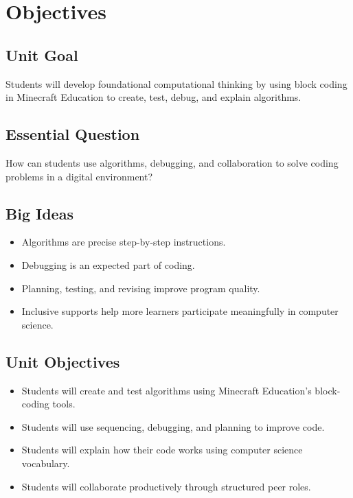 \documentclass[12pt]{article}
\begin{document}
\newpage
\section{Objectives}

\subsection{Unit Goal}

Students will develop foundational computational thinking by using block coding in Minecraft Education to create, test, debug, and explain algorithms.

\subsection{Essential Question}

How can students use algorithms, debugging, and collaboration to solve coding problems in a digital environment?

\subsection{Big Ideas}

\begin{itemize}
\item Algorithms are precise step-by-step instructions.
\item Debugging is an expected part of coding.
\item Planning, testing, and revising improve program quality.
\item Inclusive supports help more learners participate meaningfully in computer science.
\end{itemize}

\subsection{Unit Objectives}

\begin{itemize}
\item Students will create and test algorithms using Minecraft Education's block-coding tools.
\item Students will use sequencing, debugging, and planning to improve code.
\item Students will explain how their code works using computer science vocabulary.
\item Students will collaborate productively through structured peer roles.
\end{itemize}
\end{document}
